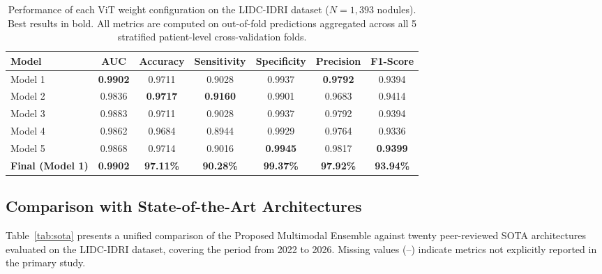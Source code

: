 \documentclass{iopjournal}
\begin{document}
\begin{table}[h]
\centering
\caption{Performance of each ViT weight configuration on the LIDC-IDRI dataset
($N=1{,}393$ nodules). Best results in bold. All metrics are computed on
out-of-fold predictions aggregated across all 5 stratified patient-level
cross-validation folds.}\label{tab:results}
\begin{tabular}{lcccccc}
\toprule
\textbf{Model} & \textbf{AUC} & \textbf{Accuracy} & \textbf{Sensitivity} &
\textbf{Specificity} & \textbf{Precision} & \textbf{F1-Score} \\
\midrule
Model 1 & \textbf{0.9902} & 0.9711 & 0.9028 & 0.9937 & \textbf{0.9792} &
0.9394 \\
Model 2 & 0.9836 & \textbf{0.9717} & \textbf{0.9160} & 0.9901 & 0.9683 &
0.9414 \\
Model 3 & 0.9883 & 0.9711 & 0.9028 & 0.9937 & 0.9792 & 0.9394 \\
Model 4 & 0.9862 & 0.9684 & 0.8944 & 0.9929 & 0.9764 & 0.9336 \\
Model 5 & 0.9868 & 0.9714 & 0.9016 & \textbf{0.9945} & 0.9817 &
\textbf{0.9399} \\
\midrule
\textbf{Final (Model 1)} & \textbf{0.9902} & \textbf{97.11\%} &
\textbf{90.28\%} & \textbf{99.37\%} & \textbf{97.92\%} & \textbf{93.94\%} \\
\bottomrule
\end{tabular}
\end{table}

\subsection{Comparison with State-of-the-Art Architectures}

Table~\ref{tab:sota} presents a unified comparison of the Proposed Multimodal
Ensemble against twenty peer-reviewed SOTA architectures evaluated on the
LIDC-IDRI dataset, covering the period from 2022 to 2026. Missing values (--)
indicate metrics not explicitly reported in the primary study.
\end{document}
